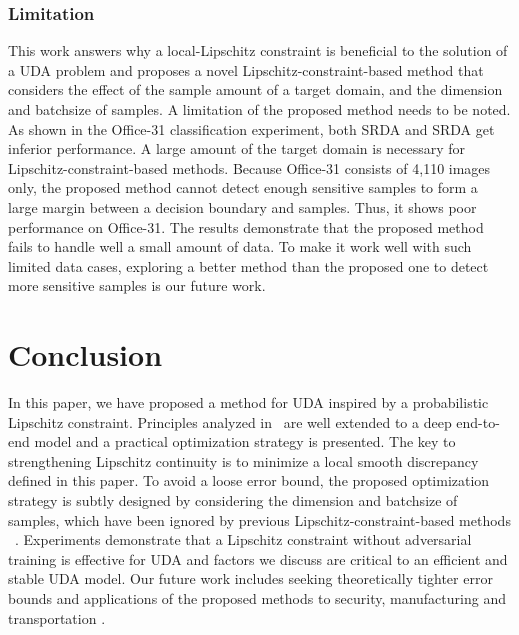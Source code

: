 \documentclass[journal,twocolumn]{IEEEtran}
\theoremstyle{definition}
\begin{document}
\subsubsection{Limitation}
This work answers why a local-Lipschitz constraint is beneficial to the solution of a UDA problem and proposes a novel Lipschitz-constraint-based method that considers the effect of the sample amount of a target domain, and the dimension and batchsize of samples. A limitation of the proposed method needs to be noted. As shown in the Office-31 classification experiment, both SRDA and SRDA get inferior performance. A large amount of the target domain is necessary for Lipschitz-constraint-based methods. Because Office-31 consists of 4,110 images only, the proposed method cannot detect enough sensitive samples to form a large margin between  a decision boundary and samples. Thus, it shows poor performance on Office-31.  The results demonstrate that the proposed method fails to handle well a small amount of data. To make it work well with such limited data cases, exploring a better method than the proposed one to detect more sensitive samples is our future work.

\section{Conclusion}
In this paper, we have proposed a method for UDA inspired by a probabilistic Lipschitz constraint. Principles analyzed in~\cite{Ben-David2014} are well extended to a deep end-to-end model and a practical optimization strategy is presented. The key to strengthening Lipschitz continuity is to minimize a local smooth discrepancy defined in this paper. To avoid a loose error bound, the proposed optimization strategy is subtly designed by considering the dimension and batchsize of samples, which have been ignored by previous Lipschitz-constraint-based methods
~\cite{shu2018a,miyato2018virtual,mao2019virtual}. 
Experiments demonstrate that a  Lipschitz constraint without adversarial training is effective for UDA and factors we discuss are critical to an efficient and stable UDA model. Our future work includes seeking  theoretically tighter error bounds and applications of the proposed methods to security, manufacturing and transportation 
\cite{9049451,9205684,8951126,8848867}.





















\ifCLASSOPTIONcaptionsoff
  \newpage
\fi



\end{document}
